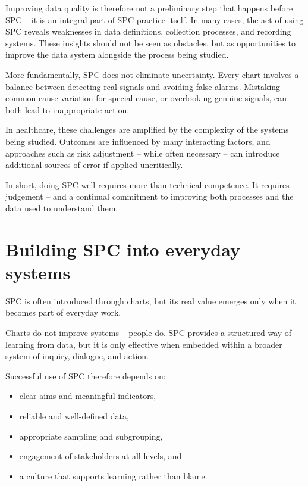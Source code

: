 \documentclass[
]{book}
\providecommand{\tightlist}{%
  \setlength{\itemsep}{0pt}\setlength{\parskip}{0pt}}
\begin{document}
Improving data quality is therefore not a preliminary step that happens before SPC -- it is an integral part of SPC practice itself. In many cases, the act of using SPC reveals weaknesses in data definitions, collection processes, and recording systems. These insights should not be seen as obstacles, but as opportunities to improve the data system alongside the process being studied.

More fundamentally, SPC does not eliminate uncertainty. Every chart involves a balance between detecting real signals and avoiding false alarms. Mistaking common cause variation for special cause, or overlooking genuine signals, can both lead to inappropriate action.

In healthcare, these challenges are amplified by the complexity of the systems being studied. Outcomes are influenced by many interacting factors, and approaches such as risk adjustment -- while often necessary -- can introduce additional sources of error if applied uncritically.

In short, doing SPC well requires more than technical competence. It requires judgement -- and a continual commitment to improving both processes and the data used to understand them.

\section{Building SPC into everyday systems}\label{building-spc-into-everyday-systems}

SPC is often introduced through charts, but its real value emerges only when it becomes part of everyday work.

Charts do not improve systems -- people do. SPC provides a structured way of learning from data, but it is only effective when embedded within a broader system of inquiry, dialogue, and action.

Successful use of SPC therefore depends on:

\begin{itemize}
\tightlist
\item
  clear aims and meaningful indicators,
\item
  reliable and well-defined data,
\item
  appropriate sampling and subgrouping,
\item
  engagement of stakeholders at all levels, and
\item
  a culture that supports learning rather than blame.
\end{itemize}
\end{document}
